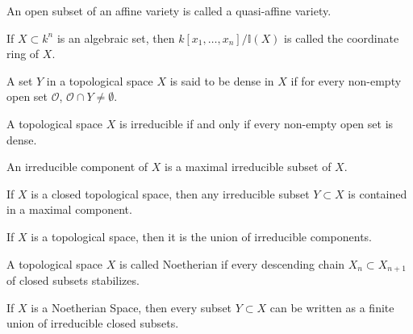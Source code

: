 \documentclass[crop=false,class=book,oneside]{standalone}
\begin{document}
                \begin{definition}
                    An open subset of an affine variety
                    is called a quasi-affine variety.
                \end{definition}
                \begin{definition}
                    If $X\subset k^n$ is an algebraic set,
                    then $k[x_1,\hdots ,x_n]/\mathbb{I}(X)$
                    is called the coordinate ring of $X$.
                \end{definition}
                \begin{definition}
                    A set $Y$ in a topological space $X$ is
                    said to be dense in $X$ if for every
                    non-empty open set $\mathcal{O}$,
                    $\mathcal{O}\cap Y\ne \emptyset$.
                \end{definition}
                \begin{theorem}
                    A topological space $X$ is irreducible if
                    and only if every non-empty open set is dense.
                \end{theorem}
                \begin{definition}
                    An irreducible component of $X$ is a
                    maximal irreducible subset of $X$.
                \end{definition}
                \begin{theorem}
                    If $X$ is a closed topological space,
                    then any irreducible subset $Y\subset X$ is
                    contained in a maximal component.
                \end{theorem}
                \begin{theorem}
                    If $X$ is a topological space,
                    then it is the union of irreducible components.
                \end{theorem}
                \begin{definition}
                    A topological space $X$ is called Noetherian
                    if every descending chain $X_n \subset X_{n+1}$
                    of closed subsets stabilizes.
                \end{definition}
                \begin{theorem}
                    If $X$ is a Noetherian Space,
                    then every subset $Y\subset X$ can be
                    written as a finite union of irreducible
                    closed subsets.
                \end{theorem}
\end{document}
